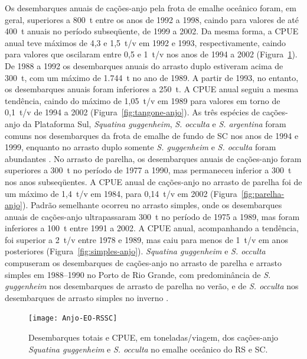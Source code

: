 \documentclass[a4paper,11pt,twoside,showtrims,onecolumn,openright,final]{memoir}
\begin{document}
Os desembarques anuais de cações-anjo pela frota de emalhe oceânico foram, em geral, 
superiores a 800~t entre os anos de 1992 a 1998, caindo para valores de até 400~t anuais 
no período subseqüente, de 1999 a 2002. Da mesma forma, a CPUE anual teve máximos 
de 4,3 e 1,5~t/v em 1992 e 1993, respectivamente, caindo para valores que oscilaram 
entre 0,5 e 1~t/v nos anos de 1994 a 2002 (Figura~\ref{fig:emalheoceanico-anjo}). %
De 1988 a 1992 os desembarques anuais do arrasto duplo estiveram acima de 300~t, 
com um máximo de 1.744~t no ano de 1989. A partir de 1993, no entanto, os 
desembarques anuais foram inferiores a 250~t. A CPUE anual seguiu a mesma 
tendência, caindo do máximo de 1,05~t/v em 1989 para valores 
em torno de 0,1~t/v de 1994 a 2002 (Figura~\ref{fig:tangone-anjo}). %
As três espécies de cações-anjo da Plataforma Sul, 
\emph{Squatina guggenheim}, \emph{S. occulta} e \emph{S. argentina} foram
comuns nos desembarques da frota de emalhe de fundo de SC nos anos de 1994 e 1999,
enquanto no arrasto duplo somente \emph{S. guggenheim} 
e \emph{S. occulta} foram abundantes \citep{mazzoleni1999}.
No arrasto de parelha, os desembarques anuais de cações-anjo foram superiores 
a 300~t no período de 1977 a 1990, mas permaneceu inferior a 300~t nos anos subseqüentes. 
A CPUE anual de cações-anjo no arrasto de parelha 
foi de um máximo de 1,4~t/v em 1984,  para 0,14~t/v em 2002 (Figura~\ref{fig:parelha-anjo}). %
Padrão semelhante ocorreu no arrasto simples, onde os desembarques anuais de 
cações-anjo ultrapassaram 300~t no período de 1975 a 1989, mas foram inferiores 
a 100~t entre 1991 a 2002. A CPUE anual, acompanhando a tendência, foi superior a 2~t/v 
entre 1978 e 1989, mas caiu para menos de 1~t/v em anos posteriores (Figura~\ref{fig:simples-anjo}). %
\emph{Squatina guggenheim} e \emph{S. occulta} compuseram os desembarques de cações-anjo
no arrasto de parelha e arrasto simples em 1988--1990 no Porto de Rio Grande, 
com predominância de \emph{S. guggenheim}
nos desembarques de arrasto de parelha no verão, e de \emph{S. occulta} nos desembarques de arrasto 
simples no inverno \citep{araujo1995a}.

%
%

\begin{figure}
\begin{center}
\texttt{[image: Anjo-EO-RSSC]}
\end{center}
\caption[Desembarques totais e CPUE dos cações-anjo no emalhe oceânico do RS e SC.]
        {Desembarques totais e CPUE, em toneladas/viagem, 
	 dos cações-anjo \emph{Squatina guggenheim} e \emph{S. occulta} no emalhe oceânico do RS e SC.}
\label{fig:emalheoceanico-anjo}
\end{figure}
\end{document}
